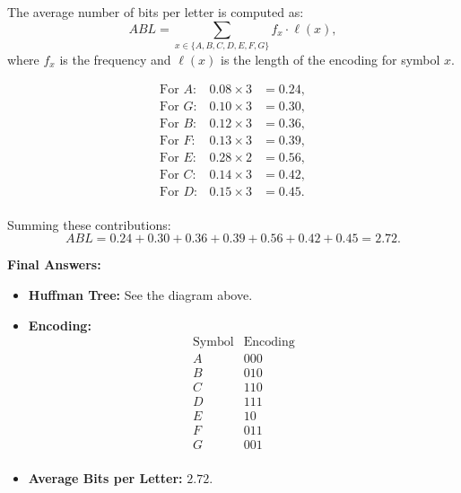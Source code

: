 \documentclass[11pt]{article}
\begin{document}
    The average number of bits per letter is computed as:
    \[
    ABL = \sum_{x \in \{A,B,C,D,E,F,G\}} f_x \cdot \ell(x),
    \]
    where \(f_x\) is the frequency and \(\ell(x)\) is the length of the encoding for symbol \(x\).
    
    \[
    \begin{array}{rcl}
    \text{For } A: & 0.08 \times 3 &= 0.24, \\
    \text{For } G: & 0.10 \times 3 &= 0.30, \\
    \text{For } B: & 0.12 \times 3 &= 0.36, \\
    \text{For } F: & 0.13 \times 3 &= 0.39, \\
    \text{For } E: & 0.28 \times 2 &= 0.56, \\
    \text{For } C: & 0.14 \times 3 &= 0.42, \\
    \text{For } D: & 0.15 \times 3 &= 0.45. \\
    \end{array}
    \]
    
    Summing these contributions:
    \[
    ABL = 0.24 + 0.30 + 0.36 + 0.39 + 0.56 + 0.42 + 0.45 = 2.72.
    \]
    
    \bigskip
    \textbf{Final Answers:}
    \begin{itemize}
        \item \textbf{Huffman Tree:} See the diagram above.
        \item \textbf{Encoding:}
        \[
        \begin{array}{c|c}
        \text{Symbol} & \text{Encoding} \\ \hline
        A & 000 \\
        B & 010 \\
        C & 110 \\
        D & 111 \\
        E & 10 \\
        F & 011 \\
        G & 001 \\
        \end{array}
        \]
        \item \textbf{Average Bits per Letter:} \(2.72\).
    \end{itemize}
    \newpage
\end{document}
